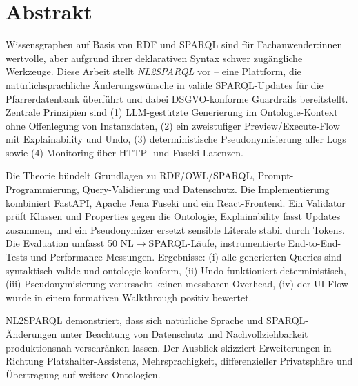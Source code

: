 
\chapter*{Abstrakt}
\label{sec:Abstrakt}
Wissensgraphen auf Basis von RDF und SPARQL sind für Fachanwender:innen wertvolle, aber aufgrund ihrer deklarativen Syntax schwer zugängliche Werkzeuge. Diese Arbeit stellt \emph{NL2SPARQL} vor – eine Plattform, die natürlichsprachliche Änderungswünsche in valide SPARQL-Updates für die Pfarrerdatenbank überführt und dabei DSGVO-konforme Guardrails bereitstellt. Zentrale Prinzipien sind (1) LLM-gestützte Generierung im Ontologie-Kontext ohne Offenlegung von Instanzdaten, (2) ein zweistufiger Preview/Execute-Flow mit Explainability und Undo, (3) deterministische Pseudonymisierung aller Logs sowie (4) Monitoring über HTTP- und Fuseki-Latenzen. 

Die Theorie bündelt Grundlagen zu RDF/OWL/SPARQL, Prompt-Programmierung, Query-Validierung und Datenschutz. Die Implementierung kombiniert FastAPI, Apache Jena Fuseki und ein React-Frontend. Ein Validator prüft Klassen und Properties gegen die Ontologie, Explainability fasst Updates zusammen, und ein Pseudonymizer ersetzt sensible Literale stabil durch Tokens. Die Evaluation umfasst 50 NL$\rightarrow$SPARQL-Läufe, instrumentierte End-to-End-Tests und Performance-Messungen. Ergebnisse: (i) alle generierten Queries sind syntaktisch valide und ontologie-konform, (ii) Undo funktioniert deterministisch, (iii) Pseudonymisierung verursacht keinen messbaren Overhead, (iv) der UI-Flow wurde in einem formativen Walkthrough positiv bewertet.

NL2SPARQL demonstriert, dass sich natürliche Sprache und SPARQL-Änderungen unter Beachtung von Datenschutz und Nachvollziehbarkeit produktionsnah verschränken lassen. Der Ausblick skizziert Erweiterungen in Richtung Platzhalter-Assistenz, Mehrsprachigkeit, differenzieller Privatsphäre und Übertragung auf weitere Ontologien.
